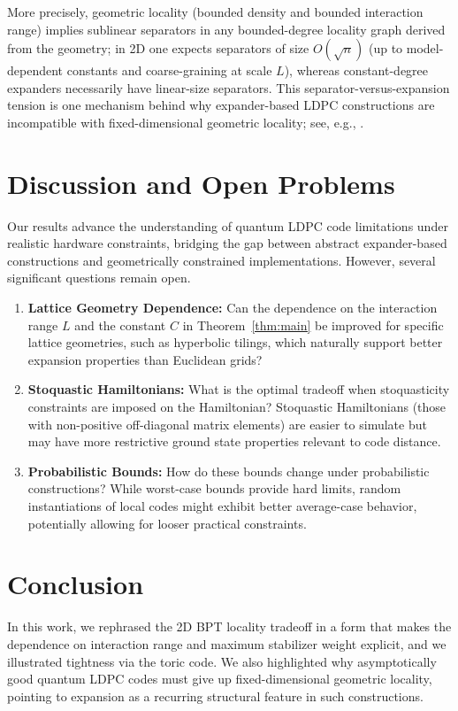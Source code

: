 \documentclass[11pt,a4paper]{article}
\theoremstyle{definition}
\theoremstyle{remark}
\begin{document}
More precisely, geometric locality (bounded density and bounded interaction range) implies sublinear separators in any bounded-degree locality graph derived from the geometry; in 2D one expects separators of size $O(\sqrt{n})$ (up to model-dependent constants and coarse-graining at scale $L$), whereas constant-degree expanders necessarily have linear-size separators. This separator-versus-expansion tension is one mechanism behind why expander-based LDPC constructions are incompatible with fixed-dimensional geometric locality; see, e.g., \cite{LiptonTarjan,MillerTengThurstonVavasis}.


\section{Discussion and Open Problems}

Our results advance the understanding of quantum LDPC code limitations under realistic hardware constraints, bridging the gap between abstract expander-based constructions and geometrically constrained implementations. However, several significant questions remain open.

\begin{enumerate}
    \item \textbf{Lattice Geometry Dependence:} Can the dependence on the interaction range $L$ and the constant $C$ in Theorem~\ref{thm:main} be improved for specific lattice geometries, such as hyperbolic tilings, which naturally support better expansion properties than Euclidean grids?
    \item \textbf{Stoquastic Hamiltonians:} What is the optimal tradeoff when stoquasticity constraints are imposed on the Hamiltonian? Stoquastic Hamiltonians (those with non-positive off-diagonal matrix elements) are easier to simulate but may have more restrictive ground state properties relevant to code distance.
    \item \textbf{Probabilistic Bounds:} How do these bounds change under probabilistic constructions? While worst-case bounds provide hard limits, random instantiations of local codes might exhibit better average-case behavior, potentially allowing for looser practical constraints.
\end{enumerate}

\section{Conclusion}

In this work, we rephrased the 2D BPT locality tradeoff in a form that makes the dependence on interaction range and maximum stabilizer weight explicit, and we illustrated tightness via the toric code. We also highlighted why asymptotically good quantum LDPC codes must give up fixed-dimensional geometric locality, pointing to expansion as a recurring structural feature in such constructions.
\end{document}
